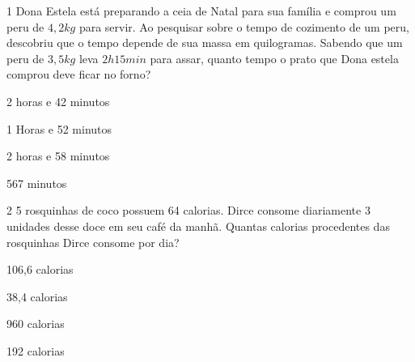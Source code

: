 \num{1} Dona Estela está preparando a ceia de Natal para sua família e
comprou um peru de $4,2 kg$ para servir. Ao pesquisar sobre o tempo de
cozimento de um peru, descobriu que o tempo depende de sua massa em
quilogramas. Sabendo que um peru de $3,5 kg$ leva $2h15min$ para assar,
quanto tempo o prato que Dona estela comprou deve ficar no forno?

\begin{escolha}%
\item 2 horas e 42 minutos
\item 1 Horas e 52 minutos
\item 2 horas e 58 minutos
\item 567 minutos
\end{escolha}










\num{2} 5 rosquinhas de coco possuem 64 calorias. Dirce consome diariamente 3
unidades desse doce em seu café da manhã. Quantas calorias procedentes
das rosquinhas Dirce consome por dia?

\begin{escolha}[itemsep=0pt]
\item 106,6 calorias
\item 38,4 calorias
\item 960 calorias
\item 192 calorias
\end{escolha}

